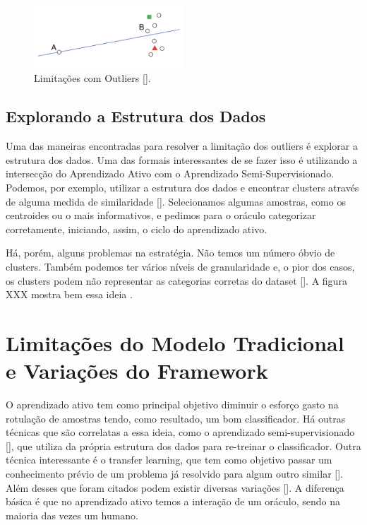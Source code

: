 \begin{figure}
  \centering
  \includegraphics[width=0.5\textwidth]{figures/limitations_outliers.png}
  \caption{Limitações com Outliers [\cite{settles2014active}].}
  \label{fig:limitations_outliers}
\end{figure}

 \subsection{Explorando a Estrutura dos Dados} 
\label{sec:explorando_estrutura_dados }

Uma das maneiras encontradas para resolver a limitação dos outliers é explorar a estrutura dos dados. Uma das formais interessantes de se fazer isso é utilizando a intersecção do Aprendizado Ativo com o Aprendizado Semi-Supervisionado. Podemos, por exemplo, utilizar a estrutura dos dados e encontrar clusters através de alguma medida de similaridade [\cite{saito2014active, dasgupta2011two}]. Selecionamos algumas amostras, como os centroides ou o mais informativos, e pedimos para o oráculo categorizar corretamente, iniciando, assim, o ciclo do aprendizado ativo. 

Há, porém, alguns problemas na estratégia. Não temos um número óbvio de clusters. Também podemos ter vários níveis de granularidade e, o pior dos casos, os clusters podem não representar as categorias corretas do dataset [\cite{dasgupta2011two, settles2014active}].  A figura XXX mostra bem essa ideia .

\section{Limitações do Modelo Tradicional e Variações do Framework}
\label{sec:limitacoes_variacoes}

O aprendizado ativo tem como principal objetivo diminuir o esforço gasto na rotulação de amostras tendo, como resultado, um bom classificador. Há outras técnicas que são correlatas a essa ideia, como o aprendizado semi-supervisionado [\cite{zhu2006semi}], que utiliza da própria estrutura dos dados para re-treinar o classificador. Outra técnica interessante é o transfer learning, que tem como objetivo passar um conhecimento prévio de um problema já resolvido para algum outro similar []. Além desses que foram citados podem existir diversas variações []. A diferença básica é que no aprendizado ativo temos a interação de um oráculo, sendo na maioria das vezes um humano. 


